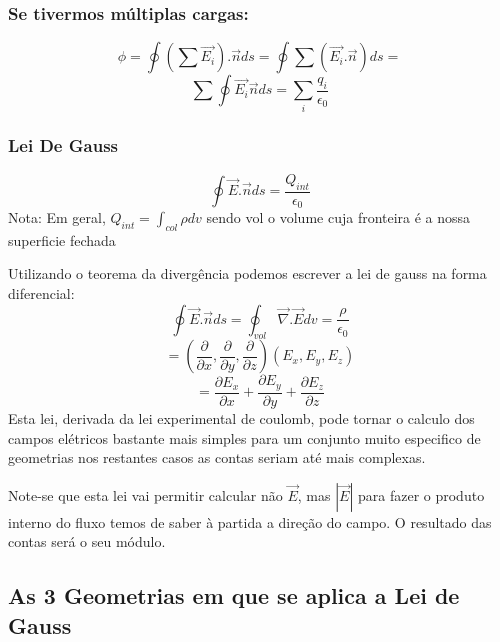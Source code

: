 \documentclass[a4paper]{article}
\begin{document}
\subsubsection{Se tivermos múltiplas cargas:}
\[\phi = \oint \left(\sum\vec{E_i}\right).\vec{n} ds = \oint\sum\left(\vec{E_i}.\vec{n}\right)ds =\]
\[\sum \oint\vec{E_i}\vec{n} ds = \sum_{i} \frac{q_i}{\epsilon_0}\]
\subsubsection{Lei De Gauss}
\[\oint \vec{E}.\vec{n} ds = \frac{Q_{int}}{\epsilon_0}\]
Nota: Em geral, $ Q_{int} = \int_{col}\rho dv $ sendo vol o volume cuja fronteira é a nossa superficie fechada


Utilizando o teorema da divergência podemos escrever a lei de gauss na forma diferencial:
\[\oint\vec{E}.\vec{n}ds = \oint_{vol}\vec{\nabla}.\vec{E}dv = \frac{\rho}{\epsilon_0}\]
\[=\left(\frac{\partial}{\partial x},\frac{\partial}{\partial y},\frac{\partial}{\partial z}\right)\left(E_x,E_y,E_z\right)\]
\[=\frac{\partial E_x}{\partial x} +\frac{\partial E_y}{\partial y} + \frac{\partial E_z}{\partial z}\]
Esta lei, derivada da lei experimental de coulomb, pode tornar o calculo dos campos elétricos bastante mais simples para um conjunto muito especifico de geometrias nos restantes casos as contas seriam  até mais complexas.

Note-se que esta lei vai permitir calcular não $ \vec{E} $, mas $|\vec{E}|$ para fazer o produto interno do fluxo temos de saber à partida a direção do campo. O resultado das contas será o seu módulo.

\subsection{As 3 Geometrias em que se aplica a Lei de Gauss}
\begin{center}
\end{center}
\end{document}
